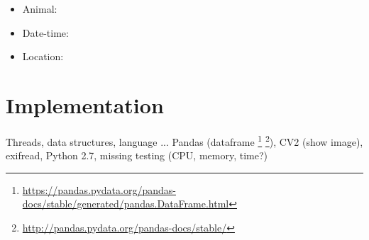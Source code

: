 \documentclass[USenglish]{uit-thesis}
\begin{document}
\begin{itemize}
\item Animal:
\item Date-time:
\item Location:
\end{itemize}

\chapter{Implementation}
Threads, data structures, language ...
Pandas (dataframe \footnote{\url{https://pandas.pydata.org/pandas-docs/stable/generated/pandas.DataFrame.html}} \footnote{\url{http://pandas.pydata.org/pandas-docs/stable/}}), CV2 (show image), exifread, Python 2.7, missing testing (CPU, memory, time?)
\end{document}
